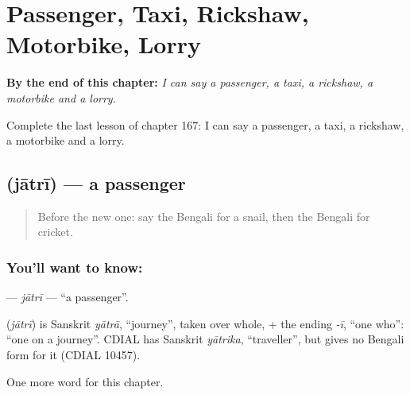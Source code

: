 
\chapter{Passenger, Taxi, Rickshaw, Motorbike, Lorry}
\label{ch:bn-passenger-taxi-rickshaw-motorbike-lorry}

\begin{chapteropening}
\textbf{By the end of this chapter:} \emph{I can say a passenger, a taxi, a rickshaw, a motorbike and a lorry.}

Complete the last lesson of chapter 167: I can say a passenger, a taxi, a rickshaw, a motorbike and a lorry.
\end{chapteropening}

\section[\texorpdfstring{\bn{যাত্রী} (jātrī)}{যাত্রী (jātrī)}]{ (jātrī) — a passenger}

\label{lesson:BN-C167-jatri}



\begin{quote}
Before the new one: say the Bengali for a snail, then the Bengali for cricket.
\end{quote}

\subsection*{You'll want to know: }
\textbf{} — \emph{jātrī} — \textquotedblleft{}a passenger\textquotedblright{}.

\begin{cousinweb}
\textbf{} (\emph{jātrī}) is Sanskrit \emph{yātrā}, \textquotedblleft{}journey\textquotedblright{}, taken over whole, + the ending \emph{-ī}, \textquotedblleft{}one who\textquotedblright{}: \textquotedblleft{}one on a journey\textquotedblright{}. CDIAL has Sanskrit \emph{yātrika}, \textquotedblleft{}traveller\textquotedblright{}, but gives no Bengali form for it (CDIAL 10457).
\end{cousinweb}

\begin{grammarlens}[title={What you've built}]
One more word for this chapter.
\end{grammarlens}

